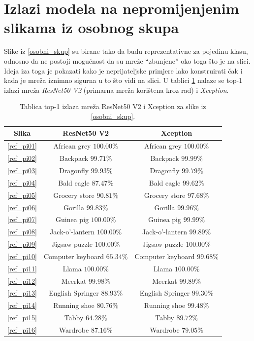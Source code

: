 \documentclass[utf8, diplomski]{fer}
\begin{document}
\section{Izlazi modela na nepromijenjenim slikama iz osobnog skupa}
Slike iz \ref{osobni_skup} su birane tako da budu reprezentativne za pojedinu klasu, odnosno da ne postoji mogućnost da su mreže ``zbunjene'' oko toga što je na slici. Ideja iza toga je pokazati kako je neprijateljske primjere lako konstruirati čak i kada je mreža iznimno sigurna u to što vidi na slici. U tablici \ref{regular_predictions} nalaze se top-1 izlazi mreža \textit{ResNet50 V2} (primarna mreža korištena kroz rad) i \textit{Xception}.
\\
\bgroup
\def\arraystretch{1.2}
\begin{table}[H]
\begin{tabular}{|c | c | c|}
\hline
Slika & ResNet50 V2 & Xception \\ \hline
\ref{ref_pi01} & African grey $100.00\%$ & African grey $100.00\%$  \\ \hline
\ref{ref_pi02} & Backpack $99.71\%$ & Backpack $99.99\%$ \\ \hline
\ref{ref_pi03} & Dragonfly $99.93\%$ & Dragonfly $99.79\%$ \\ \hline
\ref{ref_pi04} & Bald eagle $87.47\%$ & Bald eagle $99.62\%$ \\  \hline
\ref{ref_pi05} & Grocery store $90.81\%$ & Grocery store $97.68\%$ \\ \hline
\ref{ref_pi06} & Gorilla $99.83\%$ & Gorilla $99.96\%$ \\ \hline
\ref{ref_pi07} & Guinea pig $100.00\%$ & Guinea pig $99.99\%$ \\ \hline
\ref{ref_pi08} & Jack-o'-lantern $100.00\%$ & Jack-o'-lantern $99.89\%$ \\ \hline
\ref{ref_pi09} & Jigsaw puzzle $100.00\%$ & Jigsaw puzzle $100.00\%$ \\ \hline
\ref{ref_pi10} & Computer keyboard $65.34\%$ & Computer keyboard $99.68\%$ \\ \hline
\ref{ref_pi11} & Llama $100.00\%$ & Llama $100.00\%$ \\ \hline
\ref{ref_pi12} & Meerkat $99.98\%$ & Meerkat $99.89\%$ \\ \hline
\ref{ref_pi13} & English Springer $88.93\%$ & English Springer $99.30\%$ \\ \hline
\ref{ref_pi14} & Running shoe $80.76\%$ & Running shoe $99.48\%$ \\ \hline
\ref{ref_pi15} & Tabby $64.28\%$ & Tabby $89.72\%$ \\ \hline
\ref{ref_pi16} & Wardrobe $87.16\%$ & Wardrobe $79.05\%$ \\ \hline
\end{tabular}
\caption{Tablica top-1 izlaza mreža ResNet50 V2 i Xception za slike iz \ref{osobni_skup}.}\label{regular_predictions}
\end{table}
\egroup
\end{document}
